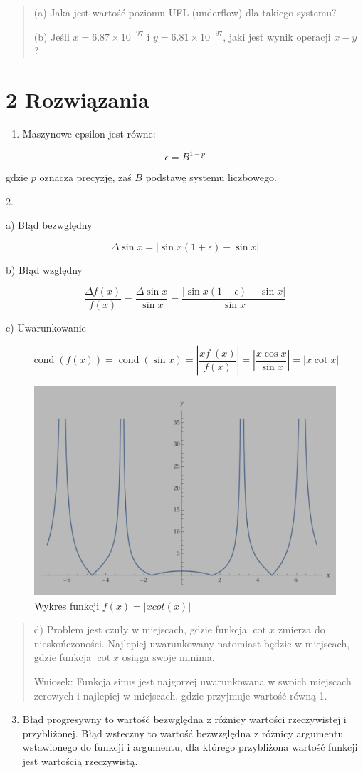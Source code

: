 \documentclass[10pt]{article}
\begin{document}
\begin{quote}
(a) Jaka jest wartość poziomu UFL (underflow) dla takiego systemu?

(b) Jeśli $x=6.87 \times 10^{-97}$ i $y=6.81 \times 10^{-97}$, jaki jest wynik operacji $x-y$ ?
\end{quote}
\section*{2 Rozwiązania}

\begin{enumerate}
  \item  Maszynowe epsilon jest równe:
\end{enumerate}

$$
\epsilon=B^{1-p}
$$

gdzie $p$ oznacza precyzję, zaś $B$ podstawę systemu liczbowego.


2.

a) Błąd bezwględny

$$
\Delta \sin x=|\sin x(1+\epsilon)-\sin x|
$$


b) Błąd względny

$$
\frac{\Delta f(x)}{f(x)}=\frac{\Delta \sin x}{\sin x}=\frac{|\sin x(1+\epsilon)-\sin x|}{\sin x}
$$

c) Uwarunkowanie

$$
\operatorname{cond}(f(x))=\operatorname{cond}(\sin x)=\left|\frac{x f^{\prime}(x)}{f(x)}\right|=\left|\frac{x \cos x}{\sin x}\right|=|x \cot x|
$$

\begin{figure}[h]
    \centering
    \includegraphics[width=0.5\linewidth]{image.png}
    \caption{Wykres funkcji $f(x) = |xcot(x)|$}
    \label{fig:enter-label}
\end{figure}

\begin{quote}
d) Problem jest czuły w miejscach, gdzie funkcja $\cot x$ zmierza do nieskończoności. Najlepiej uwarunkowany natomiast będzie w miejscach, gdzie funkcja $\cot x$ osiąga swoje minima.

Wniosek: Funkcja sinus jest najgorzej uwarunkowana w swoich miejscach zerowych i najlepiej w miejscach, gdzie przyjmuje wartość równą 1.
\end{quote}
\setlength{\parskip}{1em}
\begin{enumerate}
  \setcounter{enumi}{2}
  \item Błąd progresywny to wartość bezwględna z różnicy wartości rzeczywistej i przybliżonej. 
  Błąd wsteczny to wartość bezwzględna z różnicy argumentu wstawionego do funkcji i argumentu, dla którego przybliżona wartość funkcji jest wartością rzeczywistą.
\end{enumerate}
\end{document}
